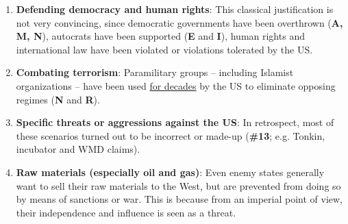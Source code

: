 \begin{enumerate}
\def\labelenumi{\arabic{enumi}.}
\tightlist
\item
  \textbf{Defending democracy and human rights}: This classical
  justification is not very convincing, since democratic governments
  have been overthrown (\textbf{A, M, N}), autocrats have been supported
  (\textbf{E} and \textbf{I}), human rights and international law have
  been violated or violations tolerated by the US.
\item
  \textbf{Combating terrorism}: Paramilitary groups -- including
  Islamist organizations -- have been used
  \href{https://en.wikipedia.org/wiki/Operation_Cyclone}{for decades} by
  the US to eliminate opposing regimes (\textbf{N} and \textbf{R}).
\item
  \textbf{Specific threats or aggressions against the US}: In
  retrospect, most of these scenarios turned out to be incorrect or
  made-up (\textbf{\#13}; e.g. Tonkin, incubator and WMD claims).
\item
  \textbf{Raw materials (especially oil and gas)}: Even enemy states
  generally want to sell their raw materials to the West, but are
  prevented from doing so by means of sanctions or war. This is because
  from an imperial point of view, their independence and influence is
  seen as a threat.


\end{enumerate}
